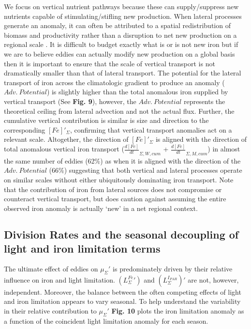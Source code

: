 We focus on vertical nutrient pathways because these can supply/suppress new nutrients capable of stimulating/stifling new production. When lateral processes generate an anomaly, it can often be attributed to a spatial redistribution of biomass and productivity rather than a disruption to net new production on a regional scale \parencite{FrengerImprintSouthernOcean2018}. It is difficult to budget exactly what is or is not new iron but if we are to believe eddies can actually modify new production on a global basis then it is important to ensure that the scale of vertical transport is not dramatically smaller than that of lateral transport. The potential for the lateral transport of iron across the climatologic gradient to produce an anomaly ($Adv. \  Potential$) is slightly higher than the total anomalous iron supplied by vertical transport (See \textbf{Fig. 9}), however, the $Adv. \  Potential$ represents the theoretical ceiling from lateral advection and not the actual flux. Further, the cumulative vertical contribution is similar is size and direction to the corresponding $[Fe]'_\Sigma$, confirming that vertical transport anomalies act on a relevant scale. Altogether, the direction of $[Fe]'_\Sigma$ is aligned with the direction of total anomalous vertical iron transport ($\frac{d[Fe]}{dt}_{\Sigma, W, cum}$ + $\frac{d[Fe]}{dt}_{\Sigma, M, cum}$) in almost the same number of eddies (62\%) as when it is aligned with the direction of the $Adv. \  Potential$ (66\%) suggesting that both vertical and lateral processes operate on similar scales without either ubiquitously dominating iron transport. Note that the contribution of iron from lateral sources does not compromise or counteract vertical transport, but does caution against assuming the entire observed iron anomaly is actually ‘new’ in a net regional context. 



    
\subsection{Division Rates and the seasonal decoupling of light and iron limitation terms}
    
The ultimate effect of eddies on $\mu_\Sigma'$ is predominately driven by their relative influence on iron and light limitation. $(L_\Sigma^{Fe}')$ and $(L_\Sigma^{I_{PAR}})'$ are not, however, independent. Moreover, the balance between the often competing effects of light and iron limitation appears to vary seasonal. To help understand the variability in their relative contribution to $\mu_\Sigma'$ \textbf{Fig. 10} plots the iron limitation anomaly as a function of the coincident light limitation anomaly for each season. 

